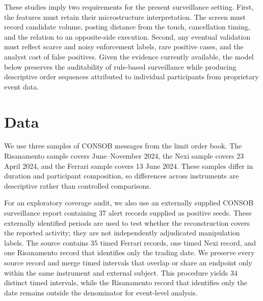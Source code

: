 \documentclass[11pt]{article}
\newenvironment{review}{\begingroup\color{blue}}{\endgroup}
\begin{document}
These studies imply two requirements for the present surveillance setting. First, the features must retain their
microstructure interpretation. The screen must record candidate volume, posting distance from the touch, cancellation
timing, and the relation to an opposite-side execution. Second, any eventual validation must reflect scarce and noisy
enforcement labels, rare positive cases, and the analyst cost of false positives. Given the evidence currently available,
the model below preserves the auditability of rule-based surveillance while producing \begin{review}descriptive order sequences attributed to individual participants\end{review} from proprietary event data.

\section{Data}
\label{sec:data}

We use \begin{review}three samples of CONSOB messages from the limit order book\end{review}. The Risanamento sample covers June--November 2024, the Nexi sample
covers 23 April 2024, and the Ferrari sample covers 13 June 2024. These samples differ in duration and participant
composition, so \begin{review}differences across instruments\end{review} are descriptive rather than controlled comparisons.

For an exploratory coverage audit, we also use an externally supplied CONSOB surveillance report containing $37$ alert
records supplied as positive seeds. These externally identified periods are used to test whether the reconstruction covers
the reported activity; they are not independently adjudicated manipulation labels. The source contains $35$ timed Ferrari
records, one timed Nexi record, and one Risanamento record that identifies only the trading date. We preserve every source
record and merge timed intervals that overlap or share an endpoint only within the same instrument and external subject.
This procedure yields $34$ distinct timed intervals, while \begin{review}the Risanamento record that identifies only the date remains outside the denominator for event-level analysis\end{review}.
\end{document}
